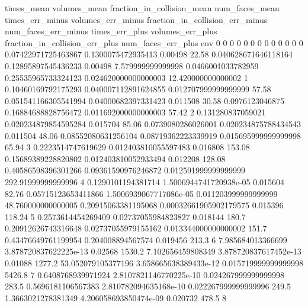 times_mean	volumes_mean	fraction_in_collision_mean	num_faces_mean	times_err_minus	volumes_err_minus	fraction_in_collision_err_minus	num_faces_err_minus	times_err_plus	volumes_err_plus	fraction_in_collision_err_plus	num_faces_err_plus	env
0	0	0	0	0	0	0	0	0	0	0	0	0
0.07422971725463867	0.1300075472935413	0.00498	22.58	0.040628671646118164	0.12895897545436233	0.00498	7.579999999999998	0.0466001033782959	0.25535965733324123	0.024620000000000003	12.420000000000002	1
0.10460169792175293	0.040007112891624855	0.012707999999999999	57.58	0.051541166305541994	0.04000682397331423	0.011508	30.58	0.0976123046875	0.16884688828756472	0.011692000000000003	57.42	2
0.131280837059021	0.020234879854595284	0.015704	85.06	0.0739080286026001	0.020234875788434543	0.011504	48.06	0.08552080631256104	0.08719362223339919	0.015695999999999998	65.94	3
0.2223514747619629	0.012403810055597483	0.016808	153.08	0.15689389228820802	0.012403810052933494	0.012208	128.08	0.40586598396301266	0.09361590976246872	0.012591999999999999	292.91999999999996	4
0.1290101194381714	1.5006944741720938e-05	0.015604	82.76	0.05715123653411866	1.5006939067717086e-05	0.011203999999999999	48.760000000000005	0.20915063381195068	0.00032661905902179575	0.015396	118.24	5
0.2573614454269409	0.02737055984823827	0.018144	180.7	0.20912626743316648	0.02737055979155162	0.013344000000000002	151.7	0.43476649761199954	0.204008894567574	0.019456	213.3	6
7.985684013366699	3.878720837622225e-13	0.02568	1530.2	7.102656459808349	3.878720837617452e-13	0.01088	1277.2	53.052079105377196	3.658665638389433e-12	0.015719999999999998	5426.8	7
0.6408768939971924	2.8107821146770225e-10	0.024267999999999998	283.5	0.5696181106567383	2.810782094635168e-10	0.022267999999999996	249.5	1.3663021278381349	4.206058693850474e-09	0.020732	478.5	8
